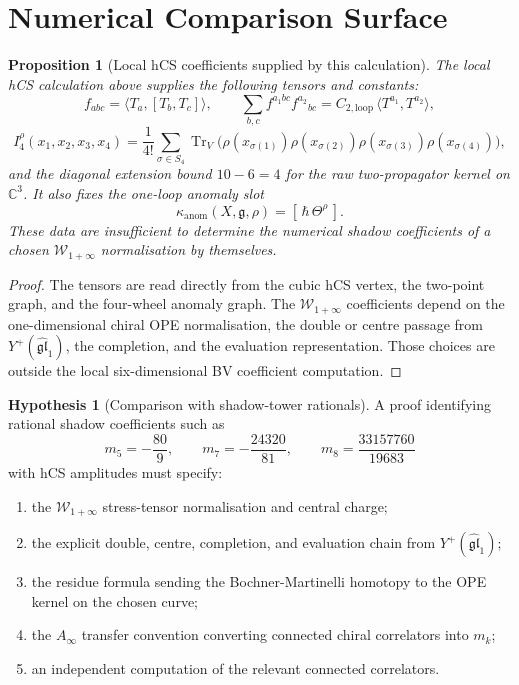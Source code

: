 \documentclass[11pt]{article}
\newtheorem{proposition}[theorem]{Proposition}
\theoremstyle{definition}
\newtheorem{hypothesis}[theorem]{Hypothesis}
\theoremstyle{remark}
\providecommand{\C}{\mathbb{C}}
\providecommand{\fg}{\mathfrak{g}}
\providecommand{\fgl}{\mathfrak{gl}}
\providecommand{\Tr}{\operatorname{Tr}}
\providecommand{\Yp}{Y^{+}}
\providecommand{\Winf}{\mathcal{W}_{1+\infty}}
\providecommand{\Ctwo}{C_{2,\mathrm{loop}}}
\providecommand{\kanom}{\kappa_{\operatorname{anom}}}
\begin{document}
\section{Numerical Comparison Surface}
\label{sec:numerical-comparison}

\begin{proposition}[Local hCS coefficients supplied by this calculation]
\label{prop:local-coefficient-surface}
The local hCS calculation above supplies the following tensors and
constants:
\[
  f_{abc}=\langle T_a,[T_b,T_c]\rangle,\qquad
  \sum_{b,c}f^{a_1bc}f^{a_2}{}_{bc}
  =\Ctwo\,\langle T^{a_1},T^{a_2}\rangle,
\]
\[
  I_4^\rho(x_1,x_2,x_3,x_4)
  =
  \frac1{4!}\sum_{\sigma\in S_4}
  \Tr_V\bigl(
  \rho(x_{\sigma(1)})\rho(x_{\sigma(2)})
  \rho(x_{\sigma(3)})\rho(x_{\sigma(4)})
  \bigr),
\]
and the diagonal extension bound $10-6=4$ for the raw two-propagator
kernel on $\C^3$.  It also fixes the one-loop anomaly slot
\[
  \kanom(X,\fg,\rho)=[\,\hbar\,\Theta^\rho\,].
\]
These data are insufficient to determine the numerical shadow
coefficients of a chosen $\Winf$ normalisation by themselves.
\end{proposition}

\begin{proof}
The tensors are read directly from the cubic hCS vertex, the two-point
graph, and the four-wheel anomaly graph.  The $\Winf$ coefficients
depend on the one-dimensional chiral OPE normalisation, the double or
centre passage from $\Yp(\widehat{\fgl}_1)$, the completion, and the
evaluation representation.  Those choices are outside the local
six-dimensional BV coefficient computation.
\end{proof}

\begin{hypothesis}[Comparison with shadow-tower rationals]
\label{hyp:shadow-comparison}
A proof identifying rational shadow coefficients such as
\[
  m_5=-\frac{80}{9},\qquad
  m_7=-\frac{24320}{81},\qquad
  m_8=\frac{33157760}{19683}
\]
with hCS amplitudes must specify:
\begin{enumerate}[label=\textup{(\roman*)}]
\item the $\Winf$ stress-tensor normalisation and central charge;
\item the explicit double, centre, completion, and evaluation chain from
$\Yp(\widehat{\fgl}_1)$;
\item the residue formula sending the Bochner-Martinelli homotopy to
the OPE kernel on the chosen curve;
\item the $A_\infty$ transfer convention converting connected chiral
correlators into $m_k$;
\item an independent computation of the relevant connected correlators.
\end{enumerate}
\end{hypothesis}
\end{document}
